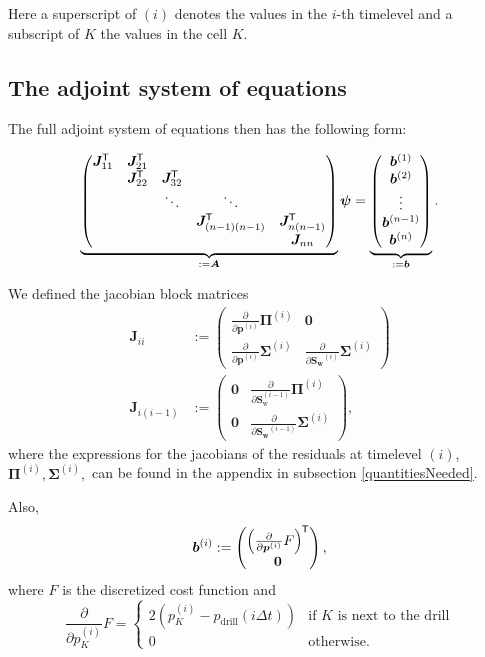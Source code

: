 \documentclass[conference]{IEEEtran}
\newcommand*{\pdiff}[2]{\ensuremath{\frac{\partial}{\partial{#2}}{#1}}}
\renewcommand*{\vec}[1]{\ensuremath{{\bm{#1}}}}
\newcommand*{\mat}[1]{\vec{#1}}
\newcommand*{\transpose}[1]{{#1}^{\mkern-1.5mu\mathsf{T}}}
\newcommand*{\tvec}[1]{\transpose{\vec{#1}}}
\newcommand*{\tmat}[1]{\tvec{#1}}
\begin{document}
Here a superscript of $(i)$ denotes the values in the $i$-th timelevel and a subscript of $K$ the values in the cell $K$.


\subsection{The adjoint system of equations}
The full adjoint system of equations then has the following form:

\begin{equation}
\underbrace{\begin{pmatrix}
\tmat{J}_{11} & \tmat{J}_{21} & & &  \\
& \tmat{J}_{22} & \tmat{J}_{32} & &  \\
& & \ddots & \ddots &  \\
& & &  \tmat{J}_{(n-1)(n-1)} &  \tmat{J}_{n(n-1)}  \\
& & &                                         & \mat{J}_{nn}
\end{pmatrix}}_{ := \mat{A}}\vec{\psi} = \underbrace{\begin{pmatrix} \vec{b}^{(1)} \\ \vec{b}^{(2)} \\ \vdots \\ \vec{b}^{(n-1)} \\ \vec{b}^{(n)} \end{pmatrix}}_{:= \vec{b}}.
\end{equation}

We defined the jacobian block matrices
\begin{align}
\mat{J}_{ii} &:= \begin{pmatrix}\pdiff{\vec{\Pi}^{(i)}}{\vec{p}^{(i)}} & \mat{0}\\ \pdiff{\vec{\Sigma}^{(i)}}{\vec{p}^{(i)}} & \pdiff{\vec{\Sigma}^{(i)}}{\vec{S_\text{w}}^{(i)}}\end{pmatrix} \\
\mat{J}_{i(i-1)} &:= \begin{pmatrix} \mat{0} & \pdiff{\mat{\Pi}^{(i)}}{\vec{S}_\text{w}^{(i-1)}}\\ \mat{0} & \pdiff{\vec{\Sigma}^{(i)}}{\vec{S_\text{w}}^{(i-1)}}\end{pmatrix},
\end{align}
where the expressions for the jacobians of the residuals at timelevel $(i)$, $\mat{\Pi}^{(i)}, \mat{\Sigma}^{(i)},$ can be found in the appendix in subsection \ref{quantitiesNeeded}.

Also,
\begin{equation}
\vec{b}^{(i)} := \begin{pmatrix} \transpose{\left(\pdiff{F}{\vec{p}^{(i)}}\right)} \\ \vec{0} \end{pmatrix},
\end{equation}
where $F$ is the discretized cost function and 
\begin{equation}
\pdiff{F}{{p}^{(i)}_K} = \begin{cases} 2(p_K^{(i)} - p_\text{drill}(i\Delta t)) & \text{if $K$ is next to the drill} \\ 0 & \text{otherwise.} \end{cases}
\end{equation}
\end{document}
